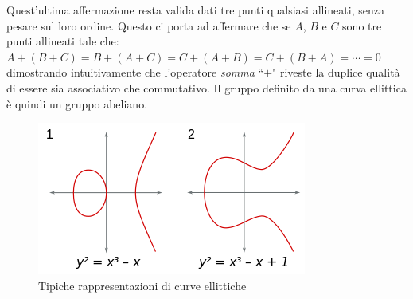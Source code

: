 \documentclass[a4paper,12pt]{tesiinfo}
\begin{document}
Quest'ultima affermazione resta valida dati tre punti qualsiasi allineati, senza pesare sul loro ordine. Questo ci porta ad affermare che se $A$, $B$ e $C$ sono tre punti allineati tale che:\\
$A+(B+C)=B+(A+C)=C+(A+B)=C+(B+A)=\cdots = 0$\\
dimostrando intuitivamente che l'operatore \textit{somma} ``$+$" riveste la duplice qualit\`a di essere sia associativo che commutativo. Il gruppo definito da una curva ellittica \`e quindi un gruppo abeliano.
\begin{figure}[H]
 \includegraphics[width=.8\textwidth,center]{commonEC}
 \caption{Tipiche rappresentazioni di curve ellittiche}
\end{figure}
\end{document}
